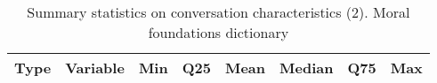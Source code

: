 \begin{table}[!h]
\centering
\caption{\label{tab:summ-tab-emf}Summary statistics on conversation characteristics (2). Moral foundations dictionary}
\centering
\begin{tabular}[t]{llrrrrrr}
\toprule
Type & Variable & Min & Q25 & Mean & Median & Q75 & Max\\


\bottomrule
\end{tabular}
\end{table}
